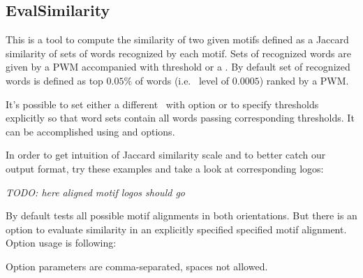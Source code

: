 \subsection{EvalSimilarity}
This is a tool to compute the similarity of two given motifs defined as a Jaccard similarity of sets of words recognized by each motif. Sets of recognized words are given by a PWM accompanied with threshold or a \pvalue. By default set of recognized words is defined as top $0.05\%$ of words (i.e. \pvalue\ level of $0.0005$) ranked by a PWM.

It's possible to set either a different \pvalue\ with  option or to specify thresholds explicitly so that word sets contain all words passing corresponding thresholds. It can be accomplished using  and  options.

In order to get intuition of Jaccard similarity scale and to better catch our output format, try these examples and take a look at corresponding logos:

\emph{TODO: here aligned motif logos should go}





By default  tests all possible motif alignments in both orientations. But there is an option  to evaluate similarity in an explicitly specified specified motif alignment. Option usage is following:


Option parameters are comma-separated, spaces not allowed.

